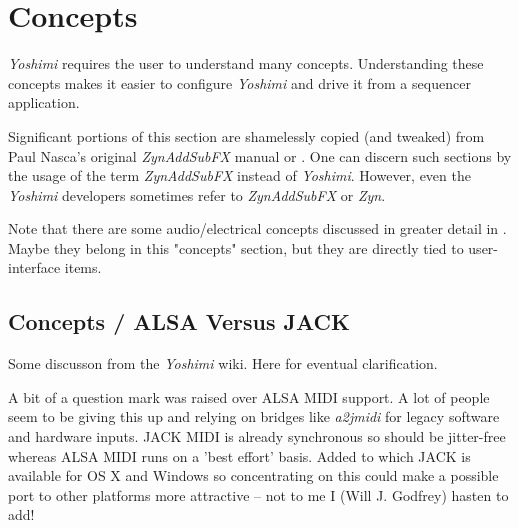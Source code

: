 %
%
%

\section{Concepts}
\label{sec:concepts}

   \textsl{Yoshimi} requires the user to understand many concepts.
   Understanding these concepts makes it easier to configure \textsl{Yoshimi}
   and drive it from a sequencer application.
   
   Significant portions of this section are shamelessly copied (and tweaked)
   from Paul Nasca's original \textsl{ZynAddSubFX}
   manual \cite{zynodt} or \cite{zynpdf}.
   One can discern such sections by the usage of the term
   \textsl{ZynAddSubFX} instead of \textsl{Yoshimi}.
   However, even the \textsl{Yoshimi} developers sometimes
   refer to \textsl{ZynAddSubFX} or \textsl{Zyn}.

   Note that there are some audio/electrical concepts discussed in greater
   detail in
   .
   Maybe they belong in this "concepts" section, but
   they are directly tied to user-interface items.

\subsection{Concepts / ALSA Versus JACK}
\label{subsec:concepts_alsa_versus_jack}

   Some discusson from the \textsl{Yoshimi} wiki.  Here for eventual
   clarification.

   A bit of a question mark was raised over ALSA MIDI support. A lot of
   people seem to be giving this up and relying on bridges like
   \textsl{a2jmidi} for legacy software and hardware inputs. JACK MIDI is
   already synchronous so should be jitter-free whereas ALSA MIDI runs on a
   'best effort' basis. Added to which JACK is available for OS X and
   Windows so concentrating on this could make a possible port to other
   platforms more attractive -- not to me I (Will J. Godfrey) hasten to add!

